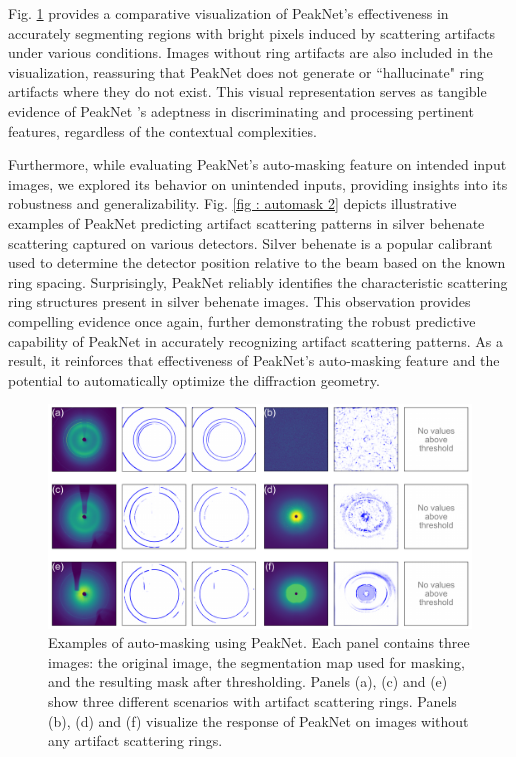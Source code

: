 \documentclass[a4paper]{article}
\newcommand{\peaknet}{PeakNet}
\begin{document}
Fig. \ref{fig : automask 1} provides a comparative visualization of \peaknet{}'s effectiveness in accurately segmenting regions with bright pixels induced by scattering artifacts under various conditions.  Images without ring artifacts are also included in the visualization, reassuring that \peaknet{} does not generate or ``hallucinate" ring artifacts where they do not exist.  This visual representation serves as tangible evidence of \peaknet{} 's adeptness in discriminating and processing pertinent features, regardless of the contextual complexities.

Furthermore, while evaluating \peaknet{}'s auto-masking feature on intended input images, we explored its behavior on unintended inputs, providing insights into its robustness and generalizability.  Fig. \ref{fig : automask 2} depicts illustrative examples of \peaknet{} predicting artifact scattering patterns in silver behenate scattering captured on various detectors. Silver behenate is a popular calibrant used to determine the detector position relative to the beam based on the known ring spacing. Surprisingly, \peaknet{} reliably identifies the characteristic scattering ring structures present in silver behenate images.  This observation provides compelling evidence once again, further demonstrating the robust predictive capability of \peaknet{} in accurately recognizing artifact scattering patterns.  As a result, it reinforces that effectiveness of \peaknet{}'s auto-masking feature and the potential to automatically optimize the diffraction geometry.


\begin{figure}[!ht]
\includegraphics[width=\textwidth,keepaspectratio]
{./figures/automask.pdf} 
\caption{Examples of auto-masking using \peaknet{}.  Each panel contains three
images: the original image, the segmentation map used for masking, and the
resulting mask after thresholding.  Panels (a), (c) and (e) show three different
scenarios with artifact scattering rings.  Panels (b), (d) and (f) visualize the
response of \peaknet{} on images without any artifact scattering rings.}
\label{fig : automask 1} 
\end{figure}
\end{document}
